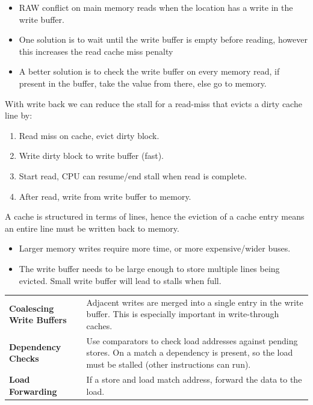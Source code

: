 \begin{minipage}{.6\textwidth}
	\begin{itemize}
		\item RAW conflict on main memory reads when the location has a write in the write buffer.
		\item One solution is to wait until the write buffer is empty before reading, however this increases the read cache miss penalty
		\item A better solution is to check the write buffer on every memory read, if present in the buffer, take the value from there, else go to memory.
	\end{itemize}

	With write back we can reduce the stall for a read-miss that evicts a dirty cache line by:
	\begin{enumerate}
		\item Read miss on cache, evict dirty block.
		\item Write dirty block to write buffer (fast).
		\item Start read, CPU can resume/end stall when read is complete.
		\item After read, write from write buffer to memory.
	\end{enumerate}
\end{minipage}
\vspace{5mm}

A cache is structured in terms of lines, hence the eviction of a cache entry means an entire line must be written back to memory.
\begin{itemize}
	\item Larger memory writes require more time, or more expensive/wider buses.
	\item The write buffer needs to be large enough to store multiple lines being evicted. Small write buffer will lead to stalls when full.
\end{itemize}

\begin{center}
	\begin{tabular}{p{} p{}}
		\textbf{Coalescing Write Buffers} & Adjacent writes are merged into a single entry in the write buffer. This is especially important in write-through caches.                                     \\
		\textbf{Dependency Checks}        & Use comparators to check load addresses against pending stores. On a match a dependency is present, so the load must be stalled (other instructions can run). \\
		\textbf{Load Forwarding}          & If a store and load match address, forward the data to the load.                                                                                              \\
	\end{tabular}
\end{center}

